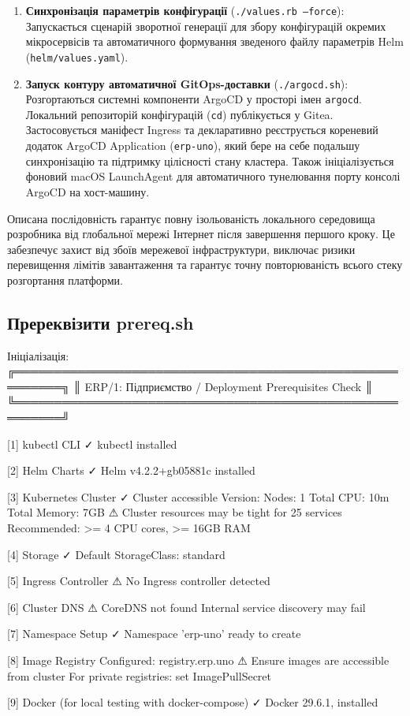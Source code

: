 \documentclass[12pt,a4paper]{article}
\let\originalfootnotesize\footnotesize
\let\oldverbatim\verbatim
\let\oldendverbatim\endverbatim
\renewenvironment{verbatim}{\originalfootnotesize\oldverbatim}{\oldendverbatim}
\begin{document}
\begin{enumerate}[leftmargin=1.5cm]
    \item \textbf{Синхронізація параметрів конфігурації} (\texttt{./values.rb --force}):
    Запускається сценарій зворотної генерації для збору конфігурацій окремих мікросервісів
    та автоматичного формування зведеного файлу параметрів Helm (\texttt{helm/values.yaml}).

    \item \textbf{Запуск контуру автоматичної GitOps-доставки} (\texttt{./argocd.sh}):
    Розгортаються системні компоненти ArgoCD у просторі імен \texttt{argocd}. Локальний
    репозиторій конфігурацій (\texttt{cd}) публікується у Gitea. Застосовується маніфест
    Ingress та декларативно реєструється кореневий додаток ArgoCD Application (\texttt{erp-uno}),
    який бере на себе подальшу синхронізацію та підтримку цілісності стану кластера.
    Також ініціалізується фоновий macOS LaunchAgent для автоматичного тунелювання порту консолі ArgoCD на хост-машину.
\end{enumerate}

Описана послідовність гарантує повну ізольованість локального середовища розробника від глобальної
мережі Інтернет після завершення першого кроку. Це забезпечує захист від збоїв мережевої інфраструктури,
виключає ризики перевищення лімітів завантаження та гарантує точну повторюваність всього стеку розгортання платформи.

\newpage
\subsection{Пререквізити prereq.sh}

Ініціалізація:
\begin{verbatim}
╔════════════════════════════════════════════════════════╗
║  ERP/1: Підприємство / Deployment Prerequisites Check  ║
╚════════════════════════════════════════════════════════╝

[1] kubectl CLI
    ✓ kubectl  installed

[2] Helm Charts
    ✓ Helm v4.2.2+gb05881c installed

[3] Kubernetes Cluster
    ✓ Cluster accessible
       Version:
       Nodes:        1
       Total CPU: 10m
       Total Memory: 7GB
       ⚠ Cluster resources may be tight for 25 services
          Recommended: >= 4 CPU cores, >= 16GB RAM

[4] Storage
    ✓ Default StorageClass: standard

[5] Ingress Controller
    ⚠ No Ingress controller detected

[6] Cluster DNS
    ⚠ CoreDNS not found
       Internal service discovery may fail

[7] Namespace Setup
    ✓ Namespace 'erp-uno' ready to create

[8] Image Registry
    Configured: registry.erp.uno
    ⚠ Ensure images are accessible from cluster
       For private registries: set ImagePullSecret

[9] Docker (for local testing with docker-compose)
    ✓ Docker 29.6.1, installed

\end{verbatim}
\end{document}
